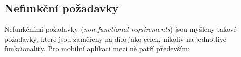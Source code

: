 

\subsection{Nefunkční požadavky}
Nefunkčními požadavky (\textit{non-functional requirements}) jsou myšleny takové požadavky, které jsou zaměřeny na dílo jako celek, nikoliv na jednotlivé funkcionality. Pro mobilní aplikaci mezi ně patří především:

